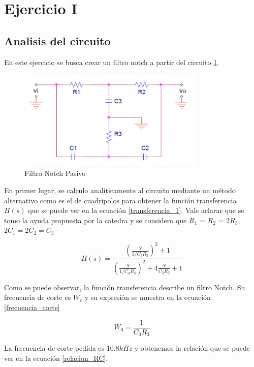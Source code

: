 \documentclass[12pt,a4paper]{article}
\begin{document}
\section{Ejercicio I}
\subsection{Analisis del circuito}
En este ejercicio se busca crear un filtro notch a partir del circuito \ref{fig:circuito_1}. 

\begin{figure}[ht]                                                       
    \centering\includegraphics[width=0.8\textwidth]{circuito_1.png}
    \caption{Filtro Notch Pasivo}
    \label{fig:circuito_1}
    \end{figure}

En primer lugar, se calculo analíticamente al circuito mediante un método alternativo como es el de cuadripolos para
obtener la función transferencia $H(s)$ que se puede ver en la ecuación \ref{transferencia_1}. Vale aclarar que se tomo la ayuda propuesta por la catedra y se considero que $R_{1}$ = $R_{2}$
= $2R_{3}$, $2C_{1} = 2C_{2} = C_{3}$

\begin{equation} H(s) = \frac{(\frac{S}{1/C_{3} R_{3}})^2 + 1} {(\frac{S}{1/C_{3}R_{3}})^2 + 4\frac{S}{C_{3}R_{3}} + 1}  \label{transferencia_1}\end{equation}

Como se puede observar, la función transferencia describe un filtro Notch. Su frecuencia de corte es
$W_c$ y su expresión se muestra en la ecuación \ref{frecuencia_corte}

\begin{equation} W_{0} =  \frac{1}{C_{3} R_{3}}  \label{frecuencia_corte}\end{equation}

La frecuencia de corte pedida es $10.8k Hz$ y obtenemos la relación que se puede ver en la ecuación 
\ref{relacion_RC}.
\end{document}

